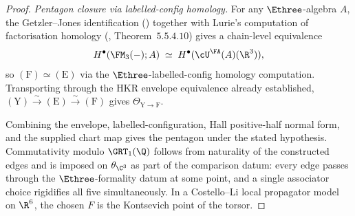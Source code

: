 \begin{proof}
\emph{Pentagon closure via labelled-config homology.} For any
$\Ethree$-algebra $A$, the Getzler--Jones identification
\textup{(}\cite{GetzlerJones1994}\textup{)} together with Lurie's
computation of factorisation homology
\textup{(}\cite{LurieHA}, Theorem~$5.5.4.10$\textup{)} gives a
chain-level equivalence
\[
H^\bullet(\FM_3(-);A)\;\simeq\;
H^\bullet(\cU^\FA(A)(\R^3)),
\]
so $(\mathrm F)\simeq(\mathrm E)$ via the $\Ethree$-labelled-config
homology computation. Transporting through the HKR envelope equivalence
already established,
$(\mathrm Y)\xrightarrow{\sim}(\mathrm E)\xrightarrow{\sim}(\mathrm F)$
gives $\Theta_{\mathrm Y\to\mathrm F}$.

Combining the envelope, labelled-configuration, Hall positive-half
normal form, and the supplied chart map gives the pentagon under the
stated hypothesis.
Commutativity modulo $\GRT_1(\Q)$ follows from naturality of the
constructed edges and is imposed on $\theta_{\C^3}$ as part of the
comparison datum: every edge passes through the $\Ethree$-formality
datum at some point, and a single associator choice rigidifies all five
simultaneously. In a Costello--Li local propagator model on $\R^6$, the
chosen $F$ is the Kontsevich point of the torsor.
\end{proof}

